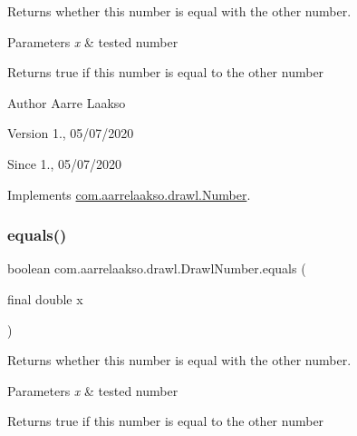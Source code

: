 Returns whether this number is equal with the other number. 


\begin{DoxyParams}{Parameters}
{\em x} & tested number \\
\hline
\end{DoxyParams}
\begin{DoxyReturn}{Returns}
true if this number is equal to the other number 
\end{DoxyReturn}
\begin{DoxyAuthor}{Author}
Aarre Laakso 
\end{DoxyAuthor}
\begin{DoxyVersion}{Version}
1., 05/07/2020 
\end{DoxyVersion}
\begin{DoxySince}{Since}
1., 05/07/2020 
\end{DoxySince}


Implements \hyperlink{interfacecom_1_1aarrelaakso_1_1drawl_1_1_number_afe7ed1040e76bfb7a01c1e3835218827}{com.\+aarrelaakso.\+drawl.\+Number}.

\mbox{\label{classcom_1_1aarrelaakso_1_1drawl_1_1_drawl_number_a09dfa96894d84cc9734e41bf4a88ae3b}} 
\subsubsection{\texorpdfstring{equals()}{equals()}\hspace{0.1cm}{\footnotesize\ttfamily [2/3]}}
{\footnotesize\ttfamily boolean com.\+aarrelaakso.\+drawl.\+Drawl\+Number.\+equals (\begin{DoxyParamCaption}\item[{final double}]{x }\end{DoxyParamCaption})}



Returns whether this number is equal with the other number. 


\begin{DoxyParams}{Parameters}
{\em x} & tested number \\
\hline
\end{DoxyParams}
\begin{DoxyReturn}{Returns}
true if this number is equal to the other number 
\end{DoxyReturn}


